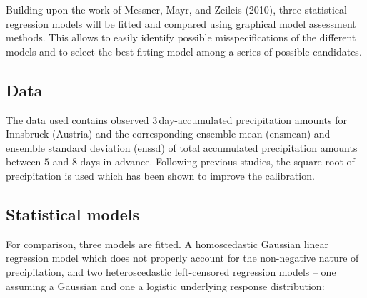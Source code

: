 \documentclass[twoside]{report}
\begin{document}
Building upon the work of Messner, Mayr, and Zeileis (2010), three statistical
regression models will be fitted and compared using
graphical model assessment methods.
This allows to easily identify possible misspecifications of the different
models and to select the best fitting model among a series of possible candidates.




\subsection{Data}

The data used contains observed 3\,day-accumulated precipitation amounts for
Innsbruck (Austria) and the corresponding ensemble mean ($\text{ensmean}$) and
ensemble standard deviation ($\text{enssd}$) of total accumulated precipitation amounts
between $5$ and $8$ days in advance.
Following previous studies, the square root of precipitation is used which has
been shown to improve the calibration.


\subsection{Statistical models}

For comparison, three models are fitted. A homoscedastic Gaussian linear regression
model which does not properly account for the non-negative nature of precipitation,
and two heteroscedastic left-censored regression models --
one assuming a Gaussian and one a logistic underlying response distribution:
\end{document}
